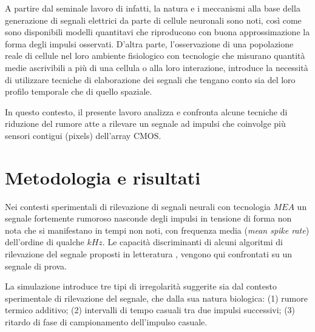 A partire dal seminale lavoro di \cite{Hodgkin1952} infatti, la natura e i meccanismi alla base della generazione di segnali elettrici da parte di cellule neuronali sono noti, così come sono disponibili modelli quantitavi che riproducono con buona approssimazione la forma degli impulsi osservati. D'altra parte, l'osservazione di una popolazione reale di cellule nel loro ambiente fisiologico con tecnologie che misurano quantità medie ascrivibili a più di una cellula o alla loro interazione, introduce la necessità di utilizzare tecniche di elaborazione dei segnali che tengano conto sia del loro profilo temporale che di quello spaziale.

In questo contesto, il presente lavoro analizza e confronta alcune tecniche di riduzione del rumore atte a rilevare un segnale ad impulsi che coinvolge più sensori contigui (pixels) dell'array CMOS.



\section{Metodologia e risultati}

Nei contesti sperimentali di rilevazione di segnali neurali con tecnologia $MEA$ un segnale fortemente rumoroso nasconde degli impulsi in tensione di forma non nota che si manifestano in tempi non noti, con frequenza media
({\it mean spike rate}) dell'ordine di qualche $kHz$. Le capacità discriminanti di alcuni algoritmi di rilevazione del segnale proposti in letteratura
\cite{Vallicelli2017}, \cite{Lambacher2011} vengono qui confrontati su un segnale di prova.

La simulazione introduce tre tipi di irregolarità suggerite sia dal contesto sperimentale di rilevazione del segnale, che dalla sua natura biologica: (1) rumore termico additivo; (2) intervalli di tempo casuali tra due impulsi successivi; (3) ritardo di fase di campionamento dell'impulso casuale.

